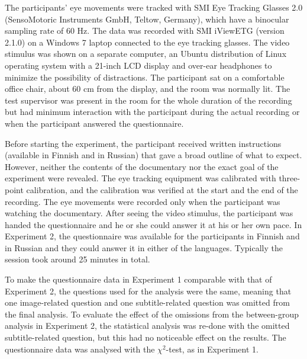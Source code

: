 \documentclass[output=paper]{langsci/langscibook}
\begin{document}
The participants' eye movements were tracked with SMI Eye Tracking Glasses 2.0 (SensoMotoric Instruments GmbH, Teltow, Germany), which have a binocular sampling rate of 60 Hz. The data was recorded with SMI iViewETG (version 2.1.0) on a Windows 7 laptop connected to the eye tracking glasses. The video stimulus was shown on a separate computer, an Ubuntu distribution of Linux operating system with a 21-inch LCD display and over-ear headphones to minimize the possibility of distractions. The participant sat on a comfortable office chair, about 60 cm from the display, and the room was normally lit. The test supervisor was present in the room for the whole duration of the recording but had minimum interaction with the participant during the actual recording or when the participant answered the questionnaire. 

Before starting the experiment, the participant received written instructions (available in Finnish and in Russian) that gave a broad outline of what to expect. However, neither the contents of the documentary nor the exact goal of the experiment were revealed. The eye tracking equipment was calibrated with three-point calibration, and the calibration was verified at the start and the end of the recording. The eye movements were recorded only when the participant was watching the documentary. After seeing the video stimulus, the participant was handed the questionnaire and he or she could answer it at his or her own pace. In Experiment 2, the questionnaire was available for the participants in Finnish and in Russian and they could answer it in either of the languages. Typically the session took around 25 minutes in total.

To make the questionnaire data in Experiment 1 comparable with that of Experiment 2, the questions used for the analysis were the same, meaning that one image-related question and one subtitle-related question was omitted from the final analysis. To evaluate the effect of the omissions from the between-group analysis in Experiment 2, the statistical analysis was re-done with the omitted subtitle-related question, but this had no noticeable effect on the results. The questionnaire data was analysed with the ${\chi}^2$-test, as in Experiment 1.
\end{document}
